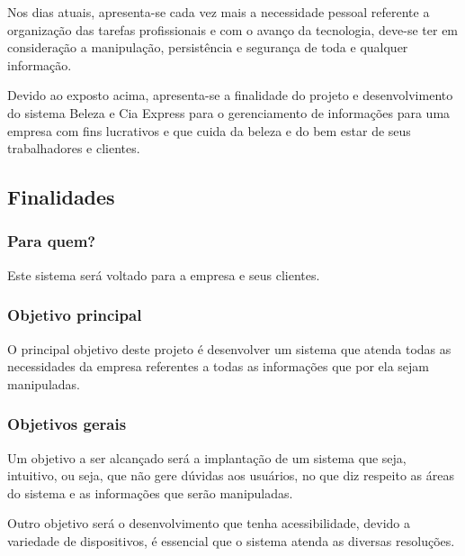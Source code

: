 Nos dias atuais, apresenta-se cada vez mais a necessidade pessoal referente a organização das tarefas profissionais e com o avanço da tecnologia, deve-se ter em consideração a manipulação, persistência e segurança de toda e qualquer informação.

Devido ao exposto acima, apresenta-se a finalidade do projeto e desenvolvimento do sistema Beleza e Cia Express para o gerenciamento de informações para uma empresa com fins lucrativos e que cuida da beleza e do bem estar de seus trabalhadores e clientes.

\subsection{Finalidades}
\subsubsection{Para quem?}
Este sistema será voltado para a empresa e seus clientes.
\subsubsection{Objetivo principal}
O principal objetivo deste projeto é desenvolver um sistema que atenda todas as necessidades da empresa referentes a todas as informações que por ela sejam manipuladas.
\subsubsection{Objetivos gerais}
Um objetivo a ser alcançado será a implantação de um sistema que seja, intuitivo, ou seja, que não gere dúvidas aos usuários, no que diz respeito as áreas do sistema e as informações que serão manipuladas.

Outro objetivo será o desenvolvimento que tenha acessibilidade, devido a variedade de dispositivos, é essencial que o sistema atenda as diversas resoluções.